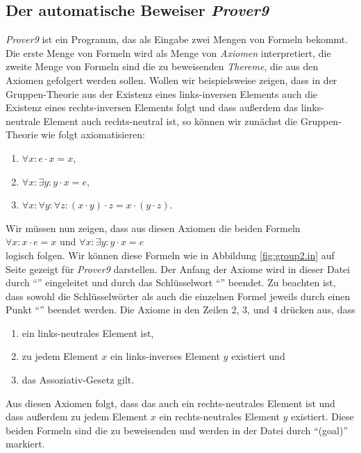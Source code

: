\subsection{Der automatische Beweiser \textsl{Prover9}}
\textsl{Prover9} ist ein Programm, das als Eingabe zwei Mengen von Formeln bekommt.  Die erste Menge von
Formeln wird als Menge von \emph{Axiomen} interpretiert, die zweite Menge von Formeln sind die zu
beweisenden \emph{Thereme}, die aus den Axiomen gefolgert werden sollen.  Wollen wir beispielsweise zeigen,
dass in der Gruppen-Theorie aus der Existenz eines  links-inversen Elements auch die Existenz eines
rechts-inversen Elements folgt und dass außerdem das links-neutrale Element auch rechts-neutral ist,
so können wir zunächst die Gruppen-Theorie wie folgt axiomatisieren:
\begin{enumerate}
\item $\forall x: e \cdot x = x$,
\item $\forall x: \exists y: y \cdot x = e$,
\item $\forall x: \forall y: \forall z: (x \cdot y) \cdot z = x \cdot (y \cdot z)$.
\end{enumerate}
Wir müssen nun zeigen, dass aus diesen Axiomen die beiden Formeln
\\[0.2cm]
\hspace*{1.3cm}
$\forall x: x \cdot e = x$ \quad und \quad $\forall x: \exists y: y \cdot x = e$ 
\\[0.2cm]
logisch folgen.  Wir können diese Formeln wie in Abbildung \ref{fig:group2.in} auf Seite
\pageref{fig:group2.in} gezeigt für \textsl{Prover9} darstellen.
Der Anfang der Axiome wird in dieser Datei durch ``'' eingeleitet und durch
das Schlüsselwort ``'' beendet.  Zu beachten ist, dass sowohl die Schlüsselwörter als
auch die einzelnen Formel jeweils durch einen Punkt ``'' beendet werden.  Die Axiome in den Zeilen
2, 3, und 4 drücken aus, dass 
\begin{enumerate}
\item {} ein links-neutrales Element ist,
\item zu jedem Element $x$ ein links-inverses Element $y$ existiert und
\item das Assoziativ-Gesetz gilt.
\end{enumerate}
Aus diesen Axiomen folgt, dass das  auch ein rechts-neutrales Element ist und dass außerdem zu
jedem Element $x$ ein rechts-neutrales Element $y$ existiert.  Diese beiden  Formeln sind die zu beweisenden 
 und werden in der Datei durch ``(goal)'' markiert.
